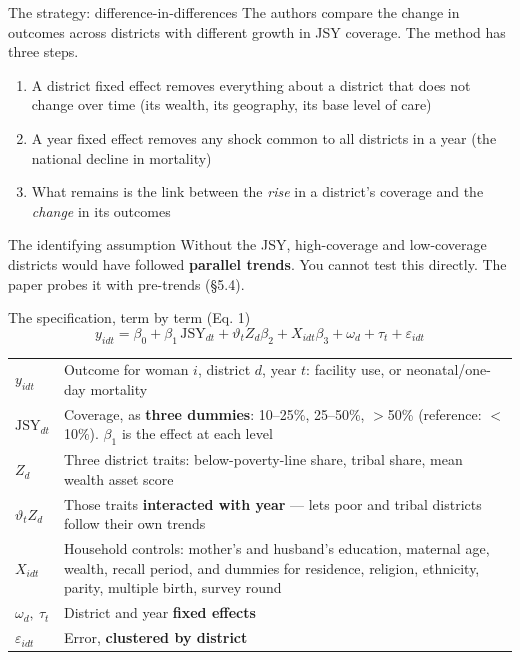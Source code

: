 \documentclass[aspectratio=169,11pt]{beamer}
\begin{document}
\begin{frame}{The strategy: difference-in-differences}
  The authors compare the change in outcomes across districts with different growth in JSY coverage. The method has three steps.
  \vspace{0.3em}
  \begin{enumerate}
    \item A district fixed effect removes everything about a district that does not change over time (its wealth, its geography, its base level of care)
    \item A year fixed effect removes any shock common to all districts in a year (the national decline in mortality)
    \item What remains is the link between the \emph{rise} in a district's coverage and the \emph{change} in its outcomes
  \end{enumerate}
  \vspace{0.3em}
  \begin{alertblock}{The identifying assumption}
    {\footnotesize Without the JSY, high-coverage and low-coverage districts would have followed \textbf{parallel trends}. You cannot test this directly. The paper probes it with pre-trends (\S5.4).}
  \end{alertblock}
\end{frame}

\begin{frame}{The specification, term by term (Eq. 1)}
  \[
    y_{idt} = \beta_0 + \beta_1\,\mathrm{JSY}_{dt} + \vartheta_t Z_d\beta_2 + X_{idt}\beta_3 + \omega_d + \tau_t + \varepsilon_{idt}
  \]
  \vspace{0.2em}
  {\footnotesize\begin{tabular}{@{}p{2.2cm}p{11.5cm}@{}}
    \toprule
    $y_{idt}$ & Outcome for woman $i$, district $d$, year $t$: facility use, or neonatal/one-day mortality \\
    $\mathrm{JSY}_{dt}$ & Coverage, as \textbf{three dummies}: 10--25\%, 25--50\%, $>$50\% (reference: $<$10\%). $\beta_1$ is the effect at each level \\
    $Z_d$ & Three district traits: below-poverty-line share, tribal share, mean wealth asset score \\
    $\vartheta_t Z_d$ & Those traits \textbf{interacted with year} --- lets poor and tribal districts follow their own trends \\
    $X_{idt}$ & Household controls: mother's and husband's education, maternal age, wealth, recall period, and dummies for residence, religion, ethnicity, parity, multiple birth, survey round \\
    $\omega_d,\ \tau_t$ & District and year \textbf{fixed effects} \\
    $\varepsilon_{idt}$ & Error, \textbf{clustered by district} \\
    \bottomrule
  \end{tabular}}
\end{frame}
\end{document}
